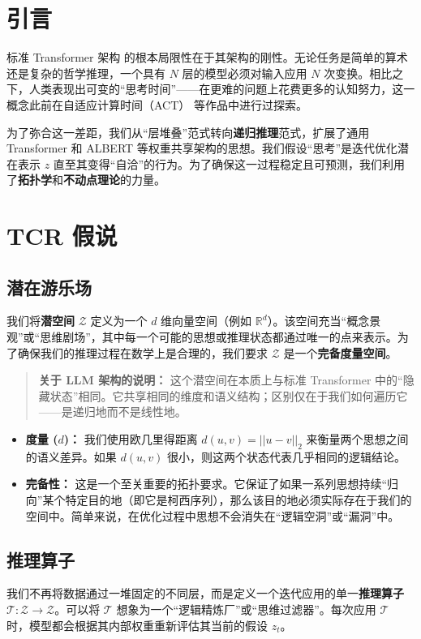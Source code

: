 \documentclass[11pt, a4paper]{article}
\begin{document}
\section{引言}
标准 Transformer 架构 \cite{vaswani2017attention} 的根本局限性在于其架构的刚性。无论任务是简单的算术还是复杂的哲学推理，一个具有 $N$ 层的模型必须对输入应用 $N$ 次变换。相比之下，人类表现出可变的“思考时间”——在更难的问题上花费更多的认知努力，这一概念此前在自适应计算时间（ACT）\cite{graves2016adaptive} 等作品中进行过探索。

为了弥合这一差距，我们从“层堆叠”范式转向\textbf{递归推理}范式，扩展了通用 Transformer \cite{dehghani2019universal} 和 ALBERT \cite{lan2020albert} 等权重共享架构的思想。我们假设“思考”是迭代优化潜在表示 $z$ 直至其变得“自洽”的行为。为了确保这一过程稳定且可预测，我们利用了\textbf{拓扑学}和\textbf{不动点理论}的力量。

\section{TCR 假说}

\subsection{潜在游乐场}
我们将\textbf{潜空间} $\mathcal{Z}$ 定义为一个 $d$ 维向量空间（例如 $\mathbb{R}^d$）。该空间充当“概念景观”或“思维剧场”，其中每一个可能的思想或推理状态都通过唯一的点来表示。为了确保我们的推理过程在数学上是合理的，我们要求 $\mathcal{Z}$ 是一个\textbf{完备度量空间}。

\begin{quote}
\textbf{关于 LLM 架构的说明：} 这个潜空间在本质上与标准 Transformer 中的“隐藏状态”相同。它共享相同的维度和语义结构；区别仅在于我们如何遍历它——是递归地而不是线性地。
\end{quote}

\begin{itemize}
    \item \textbf{度量 ($d$)：} 我们使用欧几里得距离 $d(u,v) = ||u-v||_2$ 来衡量两个思想之间的语义差异。如果 $d(u,v)$ 很小，则这两个状态代表几乎相同的逻辑结论。
    \item \textbf{完备性：} 这是一个至关重要的拓扑要求。它保证了如果一系列思想持续“归向”某个特定目的地（即它是柯西序列），那么该目的地必须实际存在于我们的空间中。简单来说，在优化过程中思想不会消失在“逻辑空洞”或“漏洞”中。
\end{itemize}

\subsection{推理算子}
我们不再将数据通过一堆固定的不同层，而是定义一个迭代应用的单一\textbf{推理算子} $\mathcal{T}: \mathcal{Z} \to \mathcal{Z}$。可以将 $\mathcal{T}$ 想象为一个“逻辑精炼厂”或“思维过滤器”。每次应用 $\mathcal{T}$ 时，模型都会根据其内部权重重新评估其当前的假设 $z_t$。
\end{document}

